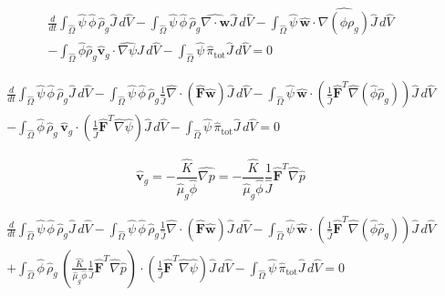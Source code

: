 \documentclass[11pt]{article}
\begin{document}
\begin{multline}
\frac{d}{dt} \int_{\widehat{\Omega}} \widehat{\psi}\,\widehat{\phi}\,\widehat{\rho}_g \widehat{J} \,d\widehat{V}
- \int_{\widehat{\Omega}} \widehat{\psi}\,\widehat{\phi}\,\widehat{\rho}_g \widehat{\nabla \cdot \mathbf{w}} \widehat{J} \,d\widehat{V}
- \int_{\widehat{\Omega}} \widehat{\psi}\,\widehat{\mathbf{w}}\cdot \widehat{\nabla\left(\phi \rho_g\right)} \widehat{J} \,d\widehat{V}
\\
-  \int_{\widehat{\Omega}} \widehat{\phi} \widehat{\rho}_g \widehat{\mathbf{v}}_g \cdot \widehat{\nabla \psi}
\widehat{J} \,d\widehat{V}
- \int_{\widehat{\Omega}} \widehat{\psi}\,\widehat{\pi}_{\mathrm{tot}} \widehat{J} \,d\widehat{V}
= 0
\end{multline}

\begin{multline}
\frac{d}{dt} \int_{\widehat{\Omega}} \widehat{\psi}\,\widehat{\phi}\,\widehat{\rho}_g \widehat{J} \,d\widehat{V}
- \int_{\widehat{\Omega}} \widehat{\psi}\,\widehat{\phi}\,\widehat{\rho}_g
\frac{1}{\widehat{J}} \widehat{\nabla}\cdot\left(\widehat{\mathbf{F}} \widehat{\mathbf{w}}\right)
\widehat{J} \,d\widehat{V}
- \int_{\widehat{\Omega}} \widehat{\psi}\,\widehat{\mathbf{w}}\cdot
\left(\frac{1}{\widehat{J}} \widehat{\mathbf{F}}^{T} \widehat{\nabla}\left(\widehat{\phi} \widehat{\rho}_g\right)\right)
\widehat{J} \,d\widehat{V}
\\
- \int_{\widehat{\Omega}} \widehat{\phi}\,\widehat{\rho}_g\,\widehat{\mathbf{v}}_g \cdot
\left(\frac{1}{\widehat{J}} \widehat{\mathbf{F}}^{T} \widehat{\nabla}\widehat{\psi}\right)
\widehat{J} \,d\widehat{V}
- \int_{\widehat{\Omega}} \widehat{\psi}\,\widehat{\pi}_{\mathrm{tot}} \widehat{J} \,d\widehat{V}
= 0
\end{multline}

\begin{equation}
    \widehat{\mathbf{v}}_g = -\frac{\widehat{K}}{\widehat{\mu}_g \widehat{\phi}} \widehat{\nabla p} = -\frac{\widehat{K}}{\widehat{\mu}_g \widehat{\phi}} \frac{1}{\widehat{J}} \widehat{\mathbf{F}}^{T} \widehat{\nabla} \widehat{p}
\end{equation}

\begin{multline}
\frac{d}{dt} \int_{\widehat{\Omega}} \widehat{\psi}\,\widehat{\phi}\,\widehat{\rho}_g \widehat{J} \,d\widehat{V}
- \int_{\widehat{\Omega}} \widehat{\psi}\,\widehat{\phi}\,\widehat{\rho}_g
\frac{1}{\widehat{J}} \widehat{\nabla}\cdot\left(\widehat{\mathbf{F}} \widehat{\mathbf{w}}\right)
\widehat{J} \,d\widehat{V}
- \int_{\widehat{\Omega}} \widehat{\psi}\,\widehat{\mathbf{w}}\cdot
\left(\frac{1}{\widehat{J}} \widehat{\mathbf{F}}^{T} \widehat{\nabla}\left(\widehat{\phi} \widehat{\rho}_g\right)\right)
\widehat{J} \,d\widehat{V}
\\
+ \int_{\widehat{\Omega}} \widehat{\phi}\,\widehat{\rho}_g\,
\left(
\frac{\widehat{K}}{\widehat{\mu}_g \widehat{\phi}} \frac{1}{\widehat{J}} \widehat{\mathbf{F}}^{T} \widehat{\nabla} \widehat{p}
\right) \cdot
\left(
\frac{1}{\widehat{J}} \widehat{\mathbf{F}}^{T}\widehat{\nabla}\widehat{\psi}\right)
\widehat{J} \,d\widehat{V}
- \int_{\widehat{\Omega}} \widehat{\psi}\,\widehat{\pi}_{\mathrm{tot}} \widehat{J} \,d\widehat{V}
= 0
\end{multline}
\end{document}
